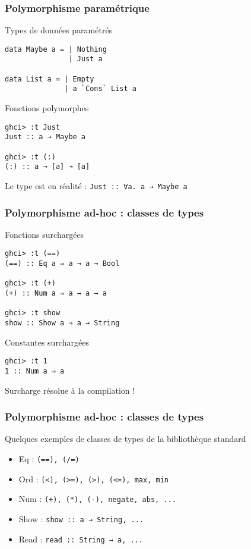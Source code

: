 \documentclass[10pt]{beamer}
\begin{document}
\begin{frame}[fragile]
\frametitle{Polymorphisme paramétrique}
\begin{block}
{Types de données paramétrés}
\begin{verbatim}
data Maybe a = | Nothing
               | Just a

data List a = | Empty
              | a `Cons` List a
\end{verbatim}
\end{block}
\begin{block}
{Fonctions polymorphes}
\begin{verbatim}
ghci> :t Just
Just :: a → Maybe a

ghci> :t (:)
(:) :: a → [a] → [a]
\end{verbatim}
\end{block}
Le type est en réalité : \verb|Just :: ∀a. a → Maybe a|
\end{frame}



\begin{frame}[fragile]
\frametitle{Polymorphisme ad-hoc : classes de types}
\begin{block}
{Fonctions surchargées}
\begin{verbatim}
ghci> :t (==)
(==) :: Eq a ⇒ a → a → Bool

ghci> :t (+)
(+) :: Num a ⇒ a → a → a

ghci> :t show
show :: Show a ⇒ a → String
\end{verbatim}
\end{block}
\begin{block}
{Constantes surchargées}
\begin{verbatim}
ghci> :t 1
1 :: Num a ⇒ a
\end{verbatim}
\end{block}
Surcharge résolue à la compilation !
\end{frame}



\begin{frame}[fragile]
\frametitle{Polymorphisme ad-hoc : classes de types}
\begin{block}
{Quelques exemples de classes de types de la bibliothèque standard}
\begin{itemize}

\item Eq : \verb|(==), (/=)|

\item Ord : \verb|(<), (>=), (>), (<=), max, min|

\item Num : \verb|(+), (*), (-), negate, abs, ...|

\item Show : \verb|show :: a → String, ...|

\item Read : \verb|read :: String → a, ...|

\end{itemize}
\end{block}
\end{frame}
\end{document}
